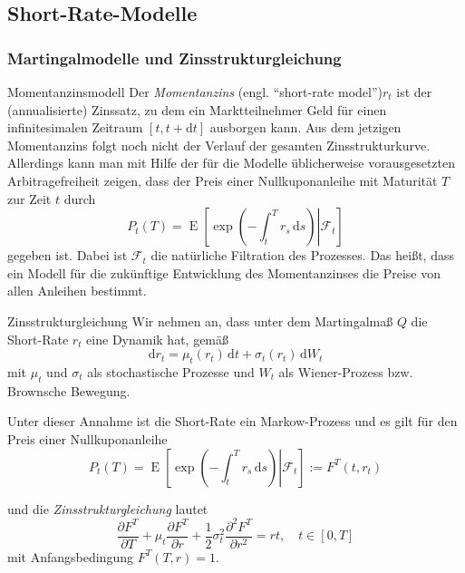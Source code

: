 


\subsection{Short-Rate-Modelle}

\subsubsection{Martingalmodelle und Zinsstrukturgleichung}

\begin{defi}{Momentanzinsmodell}
    Der \emph{Momentanzins} (engl. \enquote{short-rate model})$r_{t}$ ist der (annualisierte) Zinssatz, zu dem ein Marktteilnehmer Geld für einen infinitesimalen Zeitraum $[t,t+\mathrm{d} t]$ ausborgen kann.
    Aus dem jetzigen Momentanzins folgt noch nicht der Verlauf der gesamten Zinsstrukturkurve.
    Allerdings kann man mit Hilfe der für die Modelle üblicherweise vorausgesetzten Arbitragefreiheit zeigen, dass der Preis einer Nullkuponanleihe mit Maturität $T$ zur Zeit $t$ durch
    \[
        P_t(T)=\operatorname{E} \left[\left.\exp \left(-\int _{t}^{T}r_{s}\,\mathrm {d} s\right) \right|{\mathcal {F}}_{t}\right]
    \]
    gegeben ist.
    Dabei ist $\mathcal {F}_{t}$ die natürliche Filtration des Prozesses.
    Das heißt, dass ein Modell für die zukünftige Entwicklung des Momentanzinses die Preise von allen Anleihen bestimmt.
\end{defi}

\begin{defi}[Momentanzinsmodell]{Zinsstrukturgleichung}
    Wir nehmen an, dass unter dem Martingalmaß $Q$ die Short-Rate $r_t$ eine Dynamik hat, gemäß
    \[
        \mathrm{d} r_t = \mu_t (r_t) \, \mathrm{d} t + \sigma_t (r_t) \, \mathrm{d} W_t
    \]
    mit $\mu_t$ und $\sigma_t$ als stochastische Prozesse und $W_t$ als Wiener-Prozess bzw. Brownsche Bewegung.

    Unter dieser Annahme ist die Short-Rate ein Markow-Prozess und es gilt für den Preis einer Nullkuponanleihe
    \[
        P_t(T) = \operatorname{E} \left[ \left. \exp \left( - \int_{t}^{T} r_s \, \mathrm{d} s \right) \right| \mathcal{F}_t \right] := F^T(t, r_t)
    \]

    und die \emph{Zinsstrukturgleichung} lautet
    \[
        \frac{\partial F^T}{\partial T} + \mu_t \frac{\partial F^T}{\partial r} + \frac{1}{2} \sigma_t^2 \frac{\partial^2 F^T}{\partial r^2} = rt, \quad t \in [0, T]
    \]
    mit Anfangsbedingung $F^T(T, r) = 1$.
\end{defi}


